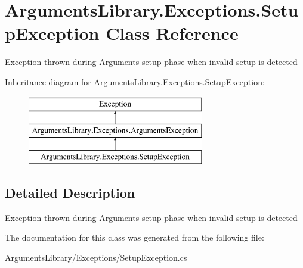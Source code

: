 \hypertarget{class_arguments_library_1_1_exceptions_1_1_setup_exception}{\section{Arguments\+Library.\+Exceptions.\+Setup\+Exception Class Reference}
\label{class_arguments_library_1_1_exceptions_1_1_setup_exception}
}


Exception thrown during \hyperlink{class_arguments_library_1_1_arguments}{Arguments} setup phase when invalid setup is detected  


Inheritance diagram for Arguments\+Library.\+Exceptions.\+Setup\+Exception\+:\begin{figure}[H]
\begin{center}
\leavevmode
\includegraphics[height=3.000000cm]{d1/d04/class_arguments_library_1_1_exceptions_1_1_setup_exception}
\end{center}
\end{figure}


\subsection{Detailed Description}
Exception thrown during \hyperlink{class_arguments_library_1_1_arguments}{Arguments} setup phase when invalid setup is detected 



The documentation for this class was generated from the following file\+:\begin{DoxyCompactItemize}
\item 
Arguments\+Library/\+Exceptions/Setup\+Exception.\+cs\end{DoxyCompactItemize}
